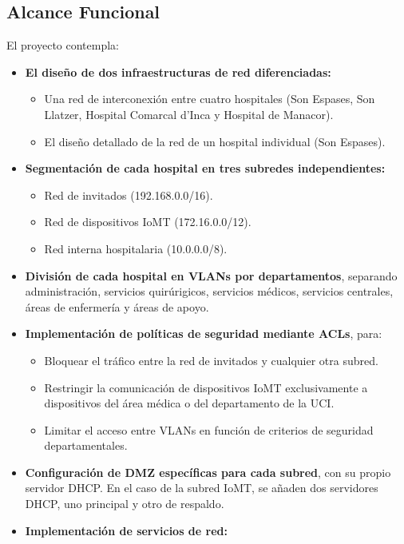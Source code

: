 \subsection{Alcance Funcional}
El proyecto contempla:
\begin{itemize}
    \item \textbf{El diseño de dos infraestructuras de red diferenciadas:}
    \begin{itemize}
        \item Una red de interconexión entre cuatro hospitales (Son Espases, Son Llatzer, Hospital Comarcal d'Inca y Hospital de Manacor).
        \item El diseño detallado de la red de un hospital individual (Son Espases).
    \end{itemize}
    \item \textbf{Segmentación de cada hospital en tres subredes independientes:}
    \begin{itemize}
        \item Red de invitados (192.168.0.0/16).
        \item Red de dispositivos \acs{IoMT} (172.16.0.0/12).
        \item Red interna hospitalaria (10.0.0.0/8).
    \end{itemize}
    \item \textbf{División de cada hospital en \acs{VLAN}s por departamentos}, separando administración, servicios quirúrigicos, servicios médicos, servicios centrales, áreas de enfermería y 
    áreas de apoyo.
    \item \textbf{Implementación de políticas de seguridad mediante \acs{ACL}s}, para:
    \begin{itemize}
        \item Bloquear el tráfico entre la red de invitados y cualquier otra subred.
        \item Restringir la comunicación de dispositivos \acs{IoMT} exclusivamente a dispositivos del área médica o del departamento de la \acs{UCI}.
        \item Limitar el acceso entre \acs{VLAN}s en función de criterios de seguridad departamentales.
    \end{itemize}
    \item \textbf{Configuración de \acs{DMZ} específicas para cada subred}, con su propio servidor \acs{DHCP}. En el caso de la subred \acs{IoMT}, se añaden dos servidores \acs{DHCP}, uno principal y 
    otro de respaldo.
    \item \textbf{Implementación de servicios de red:}

\end{itemize}
